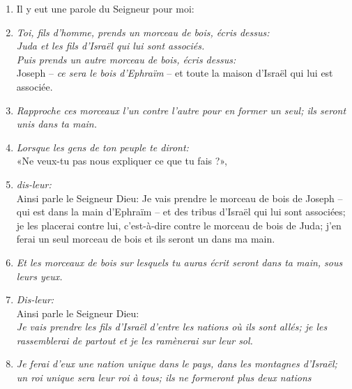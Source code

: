 \begin{enumerate}[leftmargin=\psleftmargin, labelsep = \pslabelsep, label={\arabic*}, font=\color{\pscolor}\small\textsuperscript, parsep=0em, itemsep=0em, topsep=0em ]
        \subsection*{L'unité d'Israël}
  \item {}Il y eut une parole du Seigneur pour moi:
  \item {}\textit{Toi, fils d’homme, prends un morceau de bois, écris dessus: \\
          Juda et les fils d’Israël qui lui sont associés.} \\
        \textit{Puis prends un autre morceau de bois, écris dessus:}\\
        Joseph – \textit{ce sera le bois d’Ephraïm} – et toute la maison d’Israël qui lui est associée.
  \item \textit{Rapproche ces morceaux l’un contre l’autre pour en former un seul; \brk
          ils seront unis dans ta main.}
  \item {}\textit{Lorsque les gens de ton peuple te diront:} \\
        «Ne veux-tu pas nous expliquer ce que tu fais ?»,
  \item {}\textit{dis-leur:} \\
        Ainsi parle le Seigneur Dieu: \brk
        Je vais prendre le morceau de bois de Joseph – qui est dans la main d’Ephraïm – \brk
        et des tribus d’Israël qui lui sont associées; \brk
        je les placerai contre lui, c’est-à-dire contre le morceau de bois de Juda; \brk
        j’en ferai un seul morceau de bois \brk
        et ils seront un dans ma main.
  \item {}\textit{Et les morceaux de bois sur lesquels tu auras écrit \brk
          seront dans ta main, sous leurs yeux.}
  \item {}\textit{Dis-leur:} \\
        Ainsi parle le Seigneur Dieu: \\
        \textit{Je vais prendre les fils d’Israël \brk
          d’entre les nations où ils sont allés; \brk
          je les rassemblerai de partout \brk
          et je les ramènerai sur leur sol.}
  \item {}\textit{Je ferai d’eux une nation unique dans le pays, dans les montagnes d’Israël; \brk
          un roi unique sera leur roi à tous; \brk
          ils ne formeront plus deux nations \brk
}
\end{enumerate}
